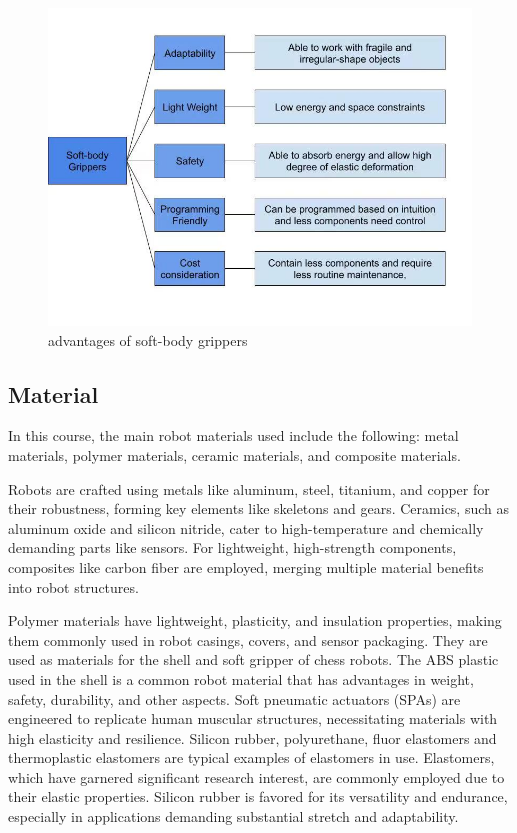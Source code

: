 \documentclass[10pt, a4paper, twocolumn]{article}
\begin{document}
\begin{figure}
    \centering
    \includegraphics[width=1\linewidth]{advantages of soft-body grippers.jpg}
    \caption{advantages of soft-body grippers}
    \label{fig:advantages of soft-body grippers}
\end{figure}

\subsection{Material}
In this course, the main robot materials used include the following: metal materials, polymer materials, ceramic materials, and composite materials.

Robots are crafted using metals like aluminum, steel, titanium, and copper for their robustness, forming key elements like skeletons and gears. Ceramics, such as aluminum oxide and silicon nitride, cater to high-temperature and chemically demanding parts like sensors. For lightweight, high-strength components, composites like carbon fiber are employed, merging multiple material benefits into robot structures.\cite{nelson_csc297_materials}

Polymer materials have lightweight, plasticity, and insulation properties, making them commonly used in robot casings, covers, and sensor packaging. They are used as materials for the shell and soft gripper of chess robots. The ABS plastic used in the shell is a common robot material that has advantages in weight, safety, durability, and other aspects. Soft pneumatic actuators (SPAs) are engineered to replicate human muscular structures, necessitating materials with high elasticity and resilience\cite{Rus2015}. Silicon rubber, polyurethane, fluor elastomers and thermoplastic elastomers are typical examples of elastomers in use.  Elastomers, which have garnered significant research interest\cite{Moseley2016}, are commonly employed due to their elastic properties. Silicon rubber is favored for its versatility and endurance, especially in applications demanding substantial stretch and adaptability\cite{Xavier2022}.
\end{document}
